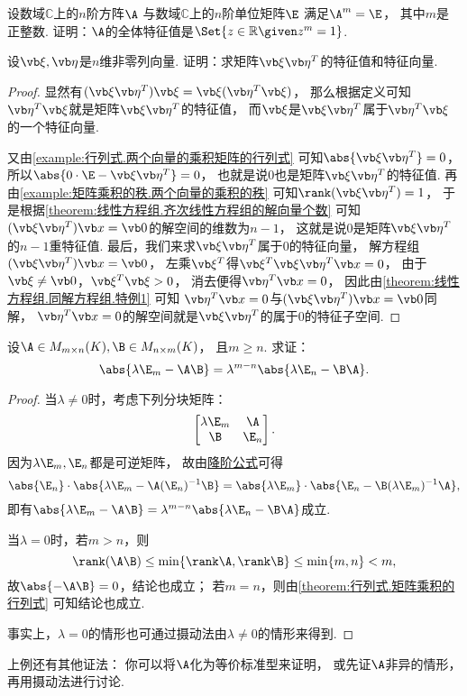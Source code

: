 \begin{example}
设数域\(\mathbb{C}\)上的\(n\)阶方阵\(\A\)
与数域\(\mathbb{C}\)上的\(n\)阶单位矩阵\(\E\)
满足\(\A^m=\E\)，
其中\(m\)是正整数.
证明：\(\A\)的全体特征值是\(\Set{ z\in\mathbb{R} \given z^m = 1 }\).
\end{example}

\begin{example}\label{example:矩阵乘积的秩.两个向量的乘积的特征值和特征向量}
设\(\a,\b\)是\(n\)维非零列向量.
证明：求矩阵\(\a\b^T\)的特征值和特征向量.
\begin{proof}
显然有\((\a\b^T)\a = \a(\b^T\a)\)，
那么根据定义可知\(\b^T\a\)就是矩阵\(\a\b^T\)的特征值，
而\(\a\)是\(\a\b^T\)属于\(\b^T\a\)的一个特征向量.

又由\cref{example:行列式.两个向量的乘积矩阵的行列式} 可知\(\abs{\a\b^T} = 0\)，
所以\(\abs{0\cdot\E-\a\b^T}=0\)，
也就是说\(0\)也是矩阵\(\a\b^T\)的特征值.
再由\cref{example:矩阵乘积的秩.两个向量的乘积的秩} 可知\(\rank(\a\b^T) = 1\)，
于是根据\cref{theorem:线性方程组.齐次线性方程组的解向量个数} 可知
\((\a\b^T)\x=\vb0\)的解空间的维数为\(n-1\)，
这就是说\(0\)是矩阵\(\a\b^T\)的\(n-1\)重特征值.
最后，我们来求\(\a\b^T\)属于\(0\)的特征向量，
解方程组\((\a\b^T)\x=\vb0\)，
左乘\(\a^T\)得\(\a^T\a\b^T\x=0\)，
由于\(\a\neq\vb0\)，\(\a^T\a>0\)，
消去便得\(\b^T\x=0\)，
因此由\cref{theorem:线性方程组.同解方程组.特例1} 可知
\(\b^T\x=0\)与\((\a\b^T)\x=\vb0\)同解，
\(\b^T\x=0\)的解空间就是\(\a\b^T\)的属于\(0\)的特征子空间.
\end{proof}
\end{example}

\begin{example}
设\(\A \in M_{m \times n}(K),
\B \in M_{n \times m}(K)\)，
且\(m \geq n\).
求证：\begin{equation}
	\abs{\lambda\E_m-\A\B} = \lambda^{m-n} \abs{\lambda\E_n-\B\A}.
\end{equation}
\begin{proof}
当\(\lambda\neq0\)时，考虑下列分块矩阵：\[
	\begin{bmatrix}
		\lambda\E_m & \A \\
		\B & \E_n
	\end{bmatrix}.
\]
因为\(\lambda\E_m,\E_n\)都是可逆矩阵，
故由\hyperref[theorem:逆矩阵.行列式降阶定理]{降阶公式}可得\[
	\abs{\E_n} \cdot \abs{\lambda\E_m - \A (\E_n)^{-1} \B}
	= \abs{\lambda\E_m} \cdot \abs{\E_n - \B (\lambda\E_m)^{-1} \A},
\]
即有\(\abs{\lambda\E_m-\A\B} = \lambda^{m-n} \abs{\lambda\E_n-\B\A}\)成立.

当\(\lambda=0\)时，若\(m>n\)，则\[
	\rank(\A\B) \leq \min\{\rank\A,\rank\B\} \leq \min\{m,n\} < m,
\]
故\(\abs{-\A\B}=0\)，结论也成立；
若\(m = n\)，则由\cref{theorem:行列式.矩阵乘积的行列式} 可知结论也成立.

事实上，\(\lambda=0\)的情形也可通过摄动法由\(\lambda\neq0\)的情形来得到.
\end{proof}
\end{example}
上例还有其他证法：
你可以将\(\A\)化为等价标准型来证明，
或先证\(\A\)非异的情形，再用摄动法进行讨论.

